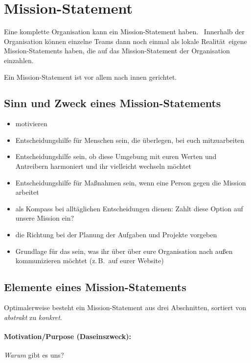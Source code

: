 \section{Mission-Statement}
\label{mission-statement}

Eine komplette Organisation kann ein Mission-Statement haben.~\cite{corporate-purpose} Innerhalb der Organisation können einzelne Teams dann noch einmal als \glqq lokale Realität\grqq\ eigene Mission-Statements haben, die auf das Mission-Statement der Organisation einzahlen.

Ein Mission-Statement ist vor allem nach innen gerichtet.

\subsection{Sinn und Zweck eines Mission-Statements}

\begin{itemize}
  \item motivieren
  \item Entscheidungshilfe für Menschen sein, die überlegen, bei euch mitzuarbeiten
  \item Entscheidungshilfe sein, ob diese Umgebung mit euren Werten und Antreibern harmoniert und ihr vielleicht wechseln möchtet
  \item Entscheidungshilfe für Maßnahmen sein, wenn eine Person gegen die Mission arbeitet
  \item als Kompass bei alltäglichen Entscheidungen dienen: \glqq Zahlt diese Option auf unsere Mission ein?\grqq
  \item die Richtung bei der Planung der Aufgaben und Projekte vorgeben
  \item Grundlage für das sein, was ihr über über eure Organisation nach außen kommunizieren möchtet (z.\,B.~auf eurer Website)
\end{itemize}


\subsection{Elemente eines Mission-Statements}

Optimalerweise besteht ein Mission-Statement aus drei Abschnitten, sortiert von \emph{abstrakt} zu \emph{konkret}.

\paragraph{Motivation/Purpose (Daseinszweck):} \emph{Warum} gibt es uns?

